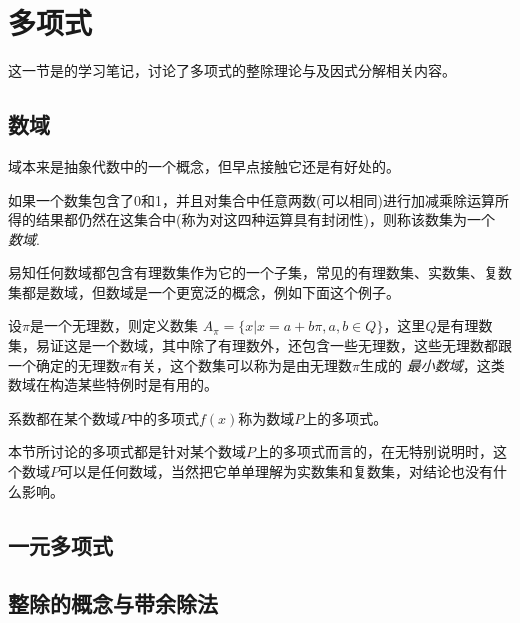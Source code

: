 
\section{多项式}
\label{sec:polynome}

这一节是\cite{advanced-algebra}的学习笔记，讨论了多项式的整除理论与及因式分解相关内容。

\subsection{数域}
\label{sec:number-field}

域本来是抽象代数中的一个概念，但早点接触它还是有好处的。

\begin{definition}
  如果一个数集包含了0和1，并且对集合中任意两数(可以相同)进行加减乘除运算所得的结果都仍然在这集合中(称为对这四种运算具有封闭性)，则称该数集为一个 \emph{数域}.
\end{definition}

易知任何数域都包含有理数集作为它的一个子集，常见的有理数集、实数集、复数集都是数域，但数域是一个更宽泛的概念，例如下面这个例子。

\begin{example}
  设$\pi$是一个无理数，则定义数集 $A_{\pi} = \{x|x=a+b\pi,a,b\in Q\}$，这里$Q$是有理数集，易证这是一个数域，其中除了有理数外，还包含一些无理数，这些无理数都跟一个确定的无理数$\pi$有关，这个数集可以称为是由无理数$\pi$生成的 \emph{最小数域}，这类数域在构造某些特例时是有用的。
\end{example}

\begin{definition}
  系数都在某个数域$P$中的多项式$f(x)$称为数域$P$上的多项式。
\end{definition}

本节所讨论的多项式都是针对某个数域$P$上的多项式而言的，在无特别说明时，这个数域$P$可以是任何数域，当然把它单单理解为实数集和复数集，对结论也没有什么影响。

\subsection{一元多项式}
\label{sec:polynome-with-one-variable}



\subsection{整除的概念与带余除法}
\label{sec:polynome-integer-division-and-devision-with-remainder}


